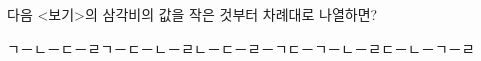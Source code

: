 다음 <보기>의 삼각비의 값을 작은 것부터 차례대로 나열하면?
\begin{choicesii}{ㄱ－ㄴ－ㄷ－ㄹ}{ㄱ－ㄷ－ㄴ－ㄹ}{ㄴ－ㄷ－ㄹ－ㄱ}{ㄷ－ㄱ－ㄴ－ㄹ}{ㄷ－ㄴ－ㄱ－ㄹ}\end{choicesii}
